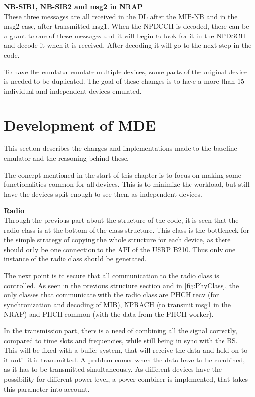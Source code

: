 \textbf{NB-SIB1, NB-SIB2 and msg2 in NRAP} \\

These three messages are all received in the DL after the MIB-NB and in the msg2 case, after transmitted msg1. When the NPDCCH is decoded, there can be a grant to one of these messages and it will begin to look for it in the NPDSCH and decode it when it is received. After decoding it will go to the next step in the code.

To have the emulator emulate multiple devices, some parts of the original device is needed to be duplicated. The goal of these changes is to have a more than 15 individual and independent devices emulated.

\section{Development of MDE}

\label{sec:Changes}

This section describes the changes and implementations made to the baseline emulator and the reasoning behind these.

The concept mentioned in the start of this chapter is to focus on making some functionalities common for all devices. This is to minimize the workload, but still have the devices split enough to see them as independent devices.

\textbf{Radio}\\

Through the previous part about the structure of the code, it is seen that the radio class is at the bottom of the class structure. This class is the bottleneck for the simple strategy of copying the whole structure for each device, as there should only be one connection to the API of the USRP B210. Thus only one instance of the radio class should be generated.

The next point is to secure that all communication to the radio class is controlled. As seen in the previous structure section and in \autoref{fig:PhyClass}, the only classes that communicate with the radio class are PHCH recv (for synchronization and decoding of MIB), NPRACH (to transmit msg1 in the NRAP) and PHCH common (with the data from the PHCH worker).

In the transmission part, there is a need of combining all the signal correctly, compared to time slots and frequencies, while still being in sync with the BS. This will be fixed with a buffer system, that will receive the data and hold on to it until it is transmitted. A problem comes when the data have to be combined, as it has to be transmitted simultaneously. As different devices have the possibility for different power level, a power combiner is implemented, that takes this parameter into account.

